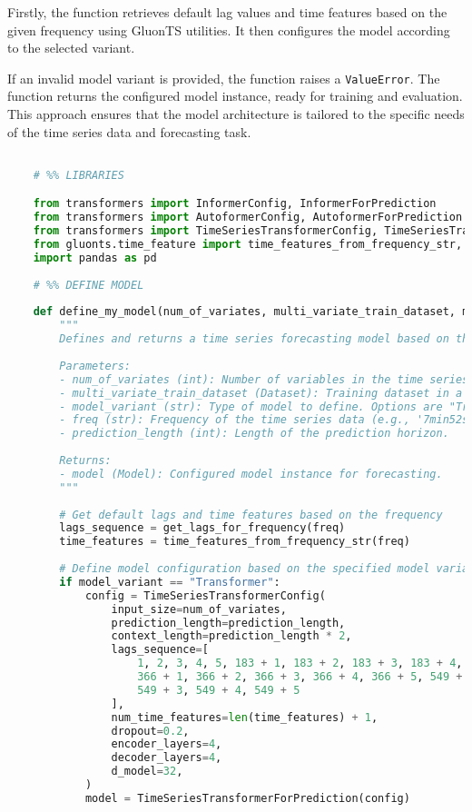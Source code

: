 Firstly, the function retrieves default lag values and time features based on the given frequency using GluonTS utilities. It then configures the model according to the selected variant.

If an invalid model variant is provided, the function raises a \texttt{ValueError}. The function returns the configured model instance, ready for training and evaluation. This approach ensures that the model architecture is tailored to the specific needs of the time series data and forecasting task.

\begin{lstlisting}[language=Python, caption={Code for defining the architecture and hyperparameters of the forecasting model}, breaklines=true, label=code3]

    # %% LIBRARIES

    from transformers import InformerConfig, InformerForPrediction
    from transformers import AutoformerConfig, AutoformerForPrediction
    from transformers import TimeSeriesTransformerConfig, TimeSeriesTransformerForPrediction
    from gluonts.time_feature import time_features_from_frequency_str, get_lags_for_frequency
    import pandas as pd
    
    # %% DEFINE MODEL
    
    def define_my_model(num_of_variates, multi_variate_train_dataset, model_variant, freq, prediction_length):
        """
        Defines and returns a time series forecasting model based on the specified variant.
        
        Parameters:
        - num_of_variates (int): Number of variables in the time series data.
        - multi_variate_train_dataset (Dataset): Training dataset in a multivariate format.
        - model_variant (str): Type of model to define. Options are "Transformer", "Informer", or "Autoformer".
        - freq (str): Frequency of the time series data (e.g., '7min52s').
        - prediction_length (int): Length of the prediction horizon.
        
        Returns:
        - model (Model): Configured model instance for forecasting.
        """
        
        # Get default lags and time features based on the frequency
        lags_sequence = get_lags_for_frequency(freq)
        time_features = time_features_from_frequency_str(freq)
    
        # Define model configuration based on the specified model variant
        if model_variant == "Transformer":
            config = TimeSeriesTransformerConfig(
                input_size=num_of_variates,
                prediction_length=prediction_length,
                context_length=prediction_length * 2,
                lags_sequence=[
                    1, 2, 3, 4, 5, 183 + 1, 183 + 2, 183 + 3, 183 + 4, 183 + 5,
                    366 + 1, 366 + 2, 366 + 3, 366 + 4, 366 + 5, 549 + 1, 549 + 2,
                    549 + 3, 549 + 4, 549 + 5
                ],
                num_time_features=len(time_features) + 1,
                dropout=0.2,
                encoder_layers=4,
                decoder_layers=4,
                d_model=32,
            )
            model = TimeSeriesTransformerForPrediction(config)
    

\end{lstlisting}
